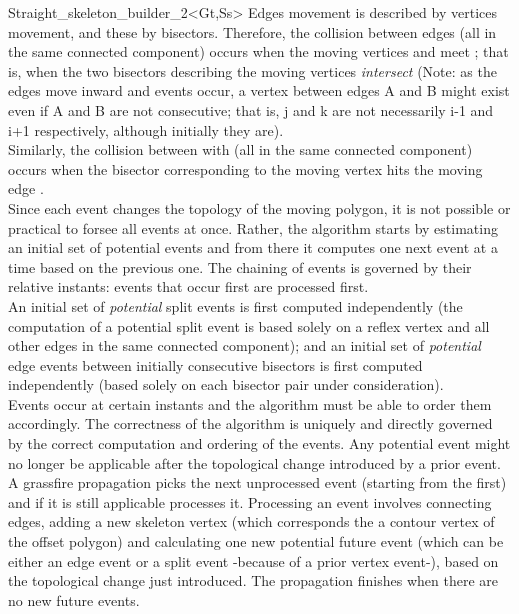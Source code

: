 \begin{ccRefClass}{Straight_skeleton_builder_2<Gt,Ss>}
Edges movement is described by vertices movement, and these by bisectors. Therefore, the collision between edges  (all in the same connected component) occurs when the moving vertices  and  meet ; that is, when the two bisectors describing the moving vertices 
{\em intersect} (Note: as the edges move inward and events occur, a vertex between edges A and B might exist even if A and B are not consecutive; that is, j and k are not necessarily i-1 and i+1 respectively, although initially they are).\\
Similarly, the collision between  with  (all in the same connected component) occurs when the bisector corresponding to the moving vertex  hits the moving edge .\\
Since each event changes the topology of the moving polygon, it is not possible or practical to forsee all events at once. Rather, the algorithm starts by estimating an initial set of potential events and from there it computes one next event at a time based on the previous one. The chaining of events is governed by their relative instants: events that occur first are processed first.\\
An initial set of \textit{potential} split events is first computed independently (the computation of a potential split event is based solely on a reflex vertex and all other edges in the same connected component); and an initial set of \textit{potential} edge events between initially consecutive bisectors is first computed independently (based solely on each bisector pair under consideration).\\
Events occur at certain instants and the algorithm must be able to order them
accordingly. The correctness of the algorithm is uniquely and directly governed by the correct computation and ordering of the events. Any potential event might no longer be applicable after the topological change introduced by a prior event.\\
A grassfire propagation picks the next unprocessed event (starting from the first) and if it is still applicable processes it. Processing an event involves connecting edges, adding a new skeleton vertex (which corresponds the a contour vertex of the offset polygon) and calculating one new potential future event (which can be either an edge event or a split event -because of a prior vertex event-), based on the topological change just introduced. The propagation finishes when there are no new future events.


\end{ccRefClass}

